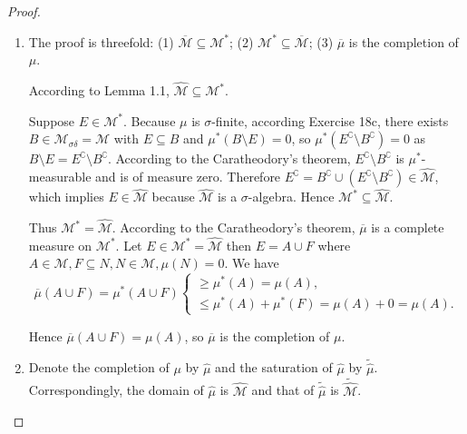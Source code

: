 \begin{proof}
    \begin{enumerate}[itemsep=0pt,label=\textbf{\alph*.}]
        \item The proof is threefold: (1) \( \overline{\mathcal{M}} \subseteq \mathcal{M}^{\ast} \); (2) \( \mathcal{M}^{\ast} \subseteq \overline{\mathcal{M}} \); (3) \( \overline{\mu} \) is the completion of \( \mu \).

              According to Lemma 1.1, \( \widehat{\mathcal{M}} \subseteq \mathcal{M}^{\ast} \).

              \bigskip

              Suppose \( E \in \mathcal{M}^{\ast} \). Because \( \mu \) is \( \sigma \)-finite, according Exercise 18c, there exists \( B \in \mathcal{M}_{\sigma\delta} = \mathcal{M} \) with \( E \subseteq B \) and \( \mu^{\ast}(B \setminus E) = 0 \), so \( \mu^{\ast}(E^{\complement} \setminus B^{\complement}) = 0 \) as \( B \setminus E = E^{\complement} \setminus B^{\complement} \). According to the Caratheodory's theorem, \( E^{\complement} \setminus B^{\complement} \) is \( \mu^{\ast} \)-measurable and is of measure zero. Therefore \( E^{\complement} = B^{\complement} \cup (E^{\complement} \setminus B^{\complement}) \in \widehat{\mathcal{M}} \), which implies \( E \in \widehat{\mathcal{M}} \) because \( \widehat{\mathcal{M}} \) is a \( \sigma \)-algebra. Hence \( \mathcal{M}^{\ast} \subseteq \widehat{\mathcal{M}} \).

              Thus \( \mathcal{M}^{\ast} = \widehat{\mathcal{M}} \). According to the Caratheodory's theorem, \( \overline{\mu} \) is a complete measure on \( \mathcal{M}^{\ast} \). Let \( E \in \mathcal{M}^{\ast} = \widehat{\mathcal{M}} \) then \( E = A \cup F \) where \( A \in \mathcal{M}, F \subseteq N, N \in \mathcal{M}, \mu(N) = 0 \). We have
              \[
                  \overline{\mu}(A \cup F) = \mu^{\ast}(A \cup F) \begin{cases}
                      \ge \mu^{\ast}(A) = \mu(A), \\
                      \le \mu^{\ast}(A) + \mu^{\ast}(F) = \mu(A) + 0 = \mu(A).
                  \end{cases}
              \]

              Hence \( \overline{\mu}(A \cup F) = \mu(A) \), so \( \overline{\mu} \) is the completion of \( \mu \).
        \item Denote the completion of \( \mu \) by \( \widehat{\mu} \) and the saturation of \( \widehat{\mu} \) by \( \widetilde{\widehat{\mu}} \). Correspondingly, the domain of \( \widehat{\mu} \) is \( \widehat{\mathcal{M}} \) and that of \( \widetilde{\widehat{\mu}} \) is \( \widetilde{\widehat{\mathcal{M}}} \).


\end{enumerate}
\end{proof}
